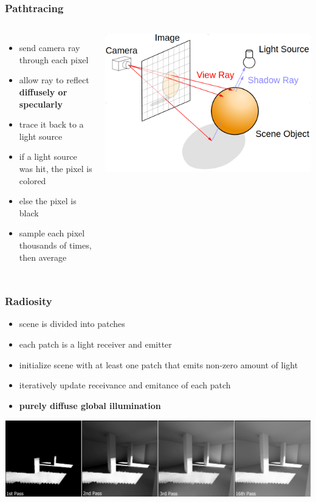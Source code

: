 \documentclass[aspectratio=169]{beamer}
\begin{document}
	\begin{frame}
		\frametitle{Pathtracing}
		\begin{columns}
				\begin{itemize}
					\item send camera ray through each pixel
					\item allow ray to reflect \textbf{diffusely or specularly}
					\item trace it back to a light source
					\item if a light source was hit, the pixel is colored
					\item else the pixel is black
					\item sample each pixel thousands of times, then average
				\end{itemize}
				\includegraphics[width=\textwidth]{img/raytrace_tut.png}
		\end{columns}
	\end{frame}

	\begin{frame}
		\frametitle{Radiosity}
		\begin{itemize}
			\item scene is divided into patches
			\item each patch is a light receiver and emitter 
			\item initialize scene with at least one patch that emits non-zero amount of light
			\item iteratively update receivance and emitance of each patch
			\item \textbf{purely diffuse global illumination}
		\end{itemize}
		\includegraphics[width=\textwidth]{img/radiosity.png}
	\end{frame}
\end{document}
